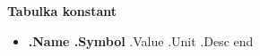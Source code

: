 \documentclass[a4paper,11pt]{article}
\begin{document}
\begin{flushleft}
\begin{multicols}{2}
\sf\large{\textbf{ Tabulka konstant }}
\begin{itemize}
\setlength\itemsep{-1pt}
{{range $idx, $sol := .}}
  \item[]\textbf{ {{.Name}} {{.Symbol}} } {{.Value}} {{.Unit}} {{.Desc}}
{{end}}
\end{itemize}  
\end{multicols}
\end{flushleft}
\end{document}
